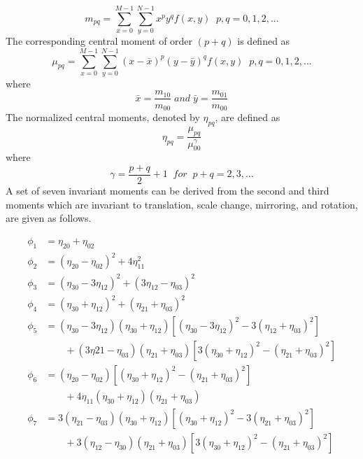 \documentclass[12pt,a4paper,oneside]{article}
\numberwithin{equation}{section}
\numberwithin{algorithm}{section}
\begin{document}
\begin{equation}\label{equation_digital_moments}
m_{pq}=\sum\limits_{x=0}^{M-1}\sum\limits_{y=0}^{N-1}x^py^qf(x,y) \;\;  p,q = 0,1 , 2, ...
\end{equation}
The corresponding central moment of order $(p+q)$ is defined as
\begin{equation}\label{equation_central_digital_moments}
\mu_{pq}=\sum\limits_{x=0}^{M-1}\sum\limits_{y=0}^{N-1}(x-\bar{x})^p(y-\bar{y})^qf(x,y) \;\;  p,q = 0,1 , 2, ...
\end{equation}
where
\begin{equation}\label{equation_xbar_ybar}
\bar{x}=\frac{m_{10}}{m_{00}} \; and \; \bar{y}=\frac{m_{01}}{m_{00}}
\end{equation}
The normalized central moments, denoted by $\eta_{pq}$, are defined as
\begin{equation}\label{equation_central_normalized_moments}
\eta_{pq}=\frac{\mu_{pq}}{\mu^{\gamma}_{00}}
\end{equation}
where
\begin{equation}\label{equation_gamma}
\gamma=\frac{p+q}{2}+1 \;\; for\;\; p+q=2,3,...
\end{equation}
A set of seven invariant moments can be derived from the second  and third moments \cite{Hu1962} which are invariant to translation, scale change, mirroring, and rotation, are given as follows.

\begin{subequations}
\begin{align}
\phi_1 &=\eta_{20}+\eta_{02} \\
\phi_2&=(\eta_{20}-\eta_{02})^2+4\eta^2_{11} \\
\phi_3&=(\eta_{30}-3\eta_{12})^2+(3\eta_{12}-\eta_{03})^2 \\
\phi_4&= (\eta_{30}+\eta_{12})^2+(\eta_{21}+\eta_{03})^2 \\
\phi_5&=(\eta_{30}-3\eta_{12})(\eta_{30}+\eta_{12})[(\eta_{30}-3\eta_{12})^2-3(\eta_{12}+\eta_{03})^2] \nonumber \\
&\qquad +(3\eta{21}-\eta_{03})(\eta_{21}+\eta_{03})[3(\eta_{30}+\eta_{12})^2-(\eta_{21}+\eta_{03})^2] \\
\phi_6&=(\eta_{20}-\eta_{02})[(\eta_{30}+\eta_{12})^2-(\eta_{21}+\eta_{03})^2] \nonumber \\
&\qquad +4\eta_{11}(\eta_{30}+\eta_{12})(\eta_{21}+\eta_{03}) \\
\phi_7&=3(\eta_{21}-\eta_{03})(\eta_{30}+\eta_{12})[(\eta_{30}+\eta_{12})^2-3(\eta_{21}+\eta_{03})^2] \nonumber\\
&\qquad +3(\eta_{12}-\eta_{30})(\eta_{21}+\eta_{03})[3(\eta_{30}+\eta_{12})^2-(\eta_{21}+\eta_{03})^2]
\end{align}
\end{subequations}
\end{document}
